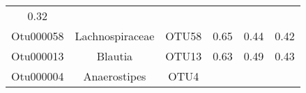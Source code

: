 \documentclass[12pt,]{article}
\begin{document}
\begin{longtable}[]{@{}cccccc@{}}
\begin{minipage}[t]{0.04\columnwidth}
0.32\strut
\end{minipage}\tabularnewline
\begin{minipage}[t]{0.08\columnwidth}\centering\strut
Otu000058\strut
\end{minipage} & \begin{minipage}[t]{0.17\columnwidth}\centering\strut
Lachnospiraceae\strut
\end{minipage} & \begin{minipage}[t]{0.15\columnwidth}\centering\strut
OTU58\strut
\end{minipage} & \begin{minipage}[t]{0.22\columnwidth}\centering\strut
0.65\strut
\end{minipage} & \begin{minipage}[t]{0.17\columnwidth}\centering\strut
0.44\strut
\end{minipage} & \begin{minipage}[t]{0.04\columnwidth}\centering\strut
0.42\strut
\end{minipage}\tabularnewline
\begin{minipage}[t]{0.08\columnwidth}\centering\strut
Otu000013\strut
\end{minipage} & \begin{minipage}[t]{0.17\columnwidth}\centering\strut
Blautia\strut
\end{minipage} & \begin{minipage}[t]{0.15\columnwidth}\centering\strut
OTU13\strut
\end{minipage} & \begin{minipage}[t]{0.22\columnwidth}\centering\strut
0.63\strut
\end{minipage} & \begin{minipage}[t]{0.17\columnwidth}\centering\strut
0.49\strut
\end{minipage} & \begin{minipage}[t]{0.04\columnwidth}\centering\strut
0.43\strut
\end{minipage}\tabularnewline
\begin{minipage}[t]{0.08\columnwidth}\centering\strut
Otu000004\strut
\end{minipage} & \begin{minipage}[t]{0.17\columnwidth}\centering\strut
Anaerostipes\strut
\end{minipage} & \begin{minipage}[t]{0.15\columnwidth}\centering\strut
OTU4\strut
\end{minipage} & \begin{minipage}[t]{0.22\columnwidth}\centering\strut

\end{minipage}
\end{longtable}
\end{document}
